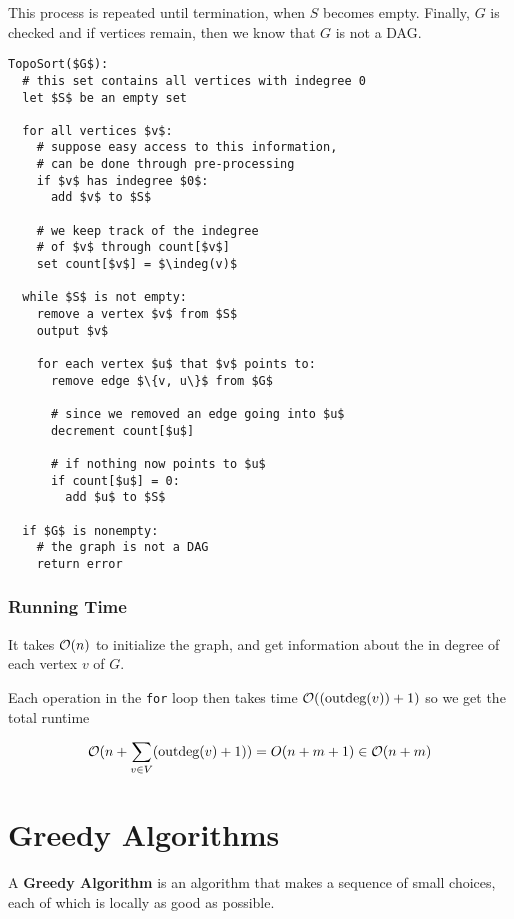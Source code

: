 \documentclass[12pt]{article}
\begin{document}
  This process is repeated until termination, when $S$ becomes empty. Finally,
  $G$ is checked and if vertices remain, then we know that $G$ is not a DAG.

  \begin{lstlisting}
TopoSort($G$):
  # this set contains all vertices with indegree 0
  let $S$ be an empty set

  for all vertices $v$:
    # suppose easy access to this information,
    # can be done through pre-processing
    if $v$ has indegree $0$:
      add $v$ to $S$

    # we keep track of the indegree
    # of $v$ through count[$v$]
    set count[$v$] = $\indeg(v)$

  while $S$ is not empty:
    remove a vertex $v$ from $S$
    output $v$

    for each vertex $u$ that $v$ points to:
      remove edge $\{v, u\}$ from $G$

      # since we removed an edge going into $u$
      decrement count[$u$]

      # if nothing now points to $u$
      if count[$u$] = 0:
        add $u$ to $S$

  if $G$ is nonempty:
    # the graph is not a DAG
    return error
  \end{lstlisting}

  \subsubsection{Running Time}

  It takes $\mathcal O(n)$ to initialize the graph, and get information about the
  in degree of each vertex $v$ of $G$.

  Each operation in the \texttt{for} loop then takes time $\mathcal O((\text{outdeg}(v)) + 1)$
  so we get the total runtime

  \[
    \mathcal O(n + \sum_{v \in V} (\text{outdeg}(v) + 1)) = O(n + m + 1) \in \mathcal O(n + m)
  \]






  \newpage

  \section{Greedy Algorithms}

   {
    A {\bf Greedy Algorithm} is an algorithm that makes a sequence of small
    choices, each of which is locally as good as possible.
  }
\end{document}
